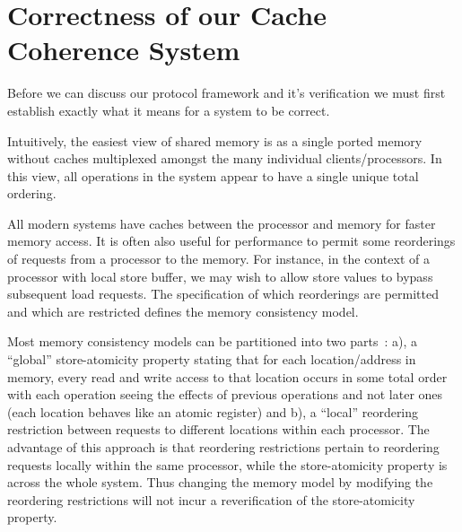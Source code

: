 \section{Correctness of our Cache Coherence System}

Before we can discuss our protocol framework and it's verification we
must first establish exactly what it means for a system to be
correct. 

Intuitively, the easiest view of shared memory is as a single ported
memory without caches multiplexed amongst the many individual clients/processors. In
this view, all operations in the system appear to have a single unique
total ordering.

All modern systems have caches between the processor and memory for faster memory access.
It is often also useful for performance to permit some reorderings of requests from a processor to the memory.
For instance, in the context of a processor with local store buffer, we may
wish to allow store values to bypass subsequent load requests. The specification of
 which reorderings are permitted and which are restricted defines the memory consistency
model.


Most memory consistency models can be partitioned into two
parts~\cite{Arvind-memory-model}: a), a ``global'' store-atomicity
property stating that for each location/address in memory, every read and write access to that 
location occurs in some total order with each operation
seeing the effects of previous operations and not later ones (each location behaves like an atomic register) and b),
a ``local'' reordering restriction between requests to different
locations within each processor. The advantage of this approach is
that reordering restrictions pertain to reordering requests locally within
the same processor, while the store-atomicity property is across the whole
system. Thus changing the memory model
by modifying the reordering restrictions will not incur a reverification of
the store-atomicity property.


